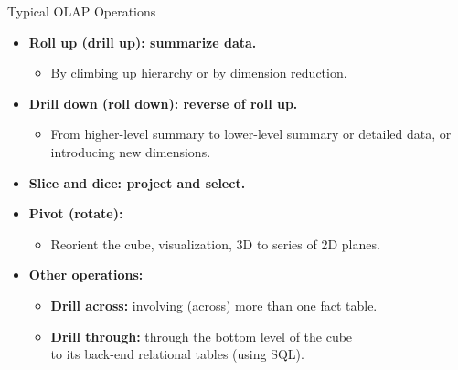 \begin{frame}{Typical OLAP Operations}
	\begin{itemize}
		\item \textbf{{\color{airforceblue}Roll up} (drill up): summarize data.}
		      \begin{itemize}
			      \item By climbing up hierarchy or by dimension reduction.
		      \end{itemize}
		\item \textbf{{\color{airforceblue}Drill down} (roll down): reverse of roll up.}
		      \begin{itemize}
			      \item From higher-level summary to lower-level summary or detailed data, or introducing new dimensions.
		      \end{itemize}
		\item \textbf{{\color{airforceblue}Slice and dice}: project and select.}
		\item \textbf{{\color{airforceblue}Pivot} (rotate):}
		      \begin{itemize}
			      \item Reorient the cube, visualization, 3D to series of 2D planes.
		      \end{itemize}
		\item \textbf{Other operations:}
		      \begin{itemize}
			      \item \textbf{{\color{airforceblue}Drill across}:} involving (across) more than one fact table.
			      \item \textbf{{\color{airforceblue}Drill through}:} through the bottom level of the cube \\ to its back-end relational tables (using SQL).
		      \end{itemize}
	\end{itemize}
\end{frame}
